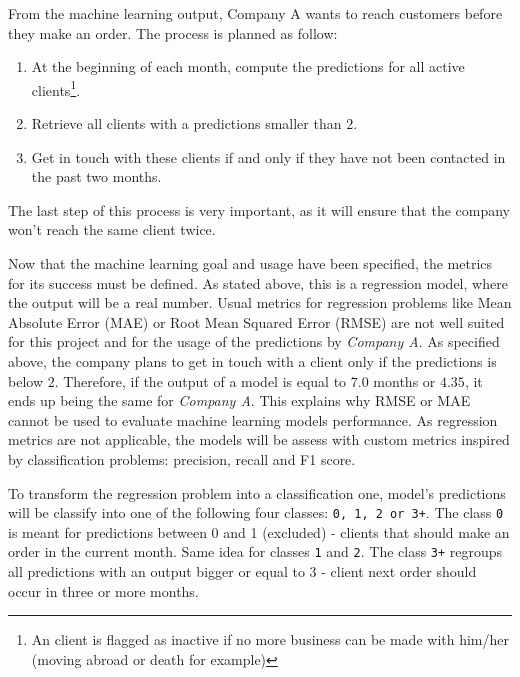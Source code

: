 From the machine learning output, Company A wants to reach customers before they make an order. The process is planned as follow:
\begin{enumerate}
    \item At the beginning of each month, compute the predictions for all active clients\footnote{An client is flagged as inactive if no more business can be made with him/her (moving abroad or death for example)}.
    \item Retrieve all clients with a predictions smaller than $2$.
    \item Get in touch with these clients if and only if they have not been contacted in the past two months.
\end{enumerate}
The last step of this process is very important, as it will ensure that the company won't reach the same client twice.


Now that the machine learning goal and usage have been specified, the metrics for its success must be defined. As stated above, this is a regression model, where the output will be a real number. Usual metrics for regression problems like Mean Absolute Error (MAE) or Root Mean Squared Error (RMSE) are not well suited for this project and for the usage of the predictions by \textit{Company A}. As specified above, the company plans to get in touch with a client only if the predictions is below $2$. Therefore, if the output of a model is equal to $7.0$ months or $4.35$, it ends up being the same for \textit{Company A}. This explains why RMSE or MAE cannot be used to evaluate machine learning models performance. As regression metrics are not applicable, the models will be assess with custom metrics inspired by classification problems: precision, recall and F1 score. 

To transform the regression problem into a classification one, model's predictions will be classify into one of the following four classes: \texttt{0, 1, 2 or 3+}. The class \texttt{0} is meant for predictions between 0 and 1 (excluded) - clients that should make an order in the current month. Same idea for classes \texttt{1} and \texttt{2}. The class \texttt{3+} regroups all predictions with an output bigger or equal to 3 - client next order should occur in three or more months.

